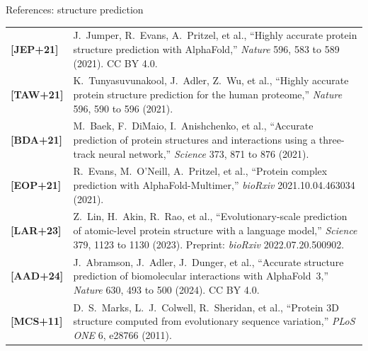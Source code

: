 \documentclass[11pt,aspectratio=169]{beamer}
\begin{document}
\begin{frame}[t]{References: structure prediction}
  \vspace{-2mm}
  \scriptsize
  \renewcommand{\arraystretch}{1.25}
  \setlength{\tabcolsep}{1.2mm}
  \begin{tabular}{@{}l>{\raggedright\arraybackslash}p{}@{}}
    \textbf{[JEP+21]} & J.~Jumper, R.~Evans, A.~Pritzel, et al., ``Highly accurate protein structure prediction with AlphaFold,'' \textit{Nature} 596, 583 to 589 (2021). CC BY 4.0. \\
    \textbf{[TAW+21]} & K.~Tunyasuvunakool, J.~Adler, Z.~Wu, et al., ``Highly accurate protein structure prediction for the human proteome,'' \textit{Nature} 596, 590 to 596 (2021). \\
    \textbf{[BDA+21]} & M.~Baek, F.~DiMaio, I.~Anishchenko, et al., ``Accurate prediction of protein structures and interactions using a three-track neural network,'' \textit{Science} 373, 871 to 876 (2021). \\
    \textbf{[EOP+21]} & R.~Evans, M.~O'Neill, A.~Pritzel, et al., ``Protein complex prediction with AlphaFold-Multimer,'' \textit{bioRxiv} 2021.10.04.463034 (2021). \\
    \textbf{[LAR+23]} & Z.~Lin, H.~Akin, R.~Rao, et al., ``Evolutionary-scale prediction of atomic-level protein structure with a language model,'' \textit{Science} 379, 1123 to 1130 (2023). Preprint: \textit{bioRxiv} 2022.07.20.500902. \\
    \textbf{[AAD+24]} & J.~Abramson, J.~Adler, J.~Dunger, et al., ``Accurate structure prediction of biomolecular interactions with AlphaFold~3,'' \textit{Nature} 630, 493 to 500 (2024). CC BY 4.0. \\
    \textbf{[MCS+11]} & D.~S.~Marks, L.~J.~Colwell, R.~Sheridan, et al., ``Protein 3D structure computed from evolutionary sequence variation,'' \textit{PLoS ONE} 6, e28766 (2011). \\
  \end{tabular}
\end{frame}
\end{document}
